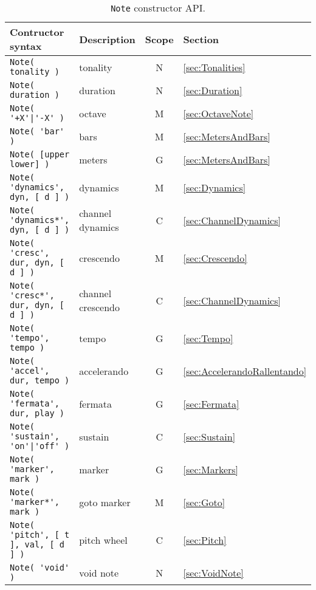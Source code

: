 \documentclass{article}
\newcommand{\note}{\lstinline!Note!\xspace}
\begin{document}
\begin{table}
  \centering
  \begin{tabular}{llcl}
    Contructor syntax & Description & Scope & Section \\
    \hline
    \lstinline!Note( tonality )! & tonality & N & \ref{sec:Tonalities} \\
    \lstinline!Note( duration )! & duration & N & \ref{sec:Duration} \\
    \lstinline!Note( '+X'|'-X' )! & octave & M & \ref{sec:OctaveNote} \\
    \lstinline!Note( 'bar' )! & bars & M & \ref{sec:MetersAndBars} \\
    \lstinline!Note( [upper lower] )! & meters & G & \ref{sec:MetersAndBars} \\
    \lstinline!Note( 'dynamics', dyn, [ d ] )! & dynamics & M & \ref{sec:Dynamics} \\
    \lstinline!Note( 'dynamics*', dyn, [ d ] )! & channel dynamics & C & \ref{sec:ChannelDynamics} \\
    \lstinline!Note( 'cresc', dur, dyn, [ d ] )! & crescendo & M & \ref{sec:Crescendo} \\
    \lstinline!Note( 'cresc*', dur, dyn, [ d ] )! & channel crescendo & C & \ref{sec:ChannelDynamics} \\
    \lstinline!Note( 'tempo', tempo )! & tempo & G & \ref{sec:Tempo} \\
    \lstinline!Note( 'accel', dur, tempo )! & accelerando & G & \ref{sec:AccelerandoRallentando} \\
    \lstinline!Note( 'fermata', dur, play )! & fermata & G & \ref{sec:Fermata} \\
    \lstinline!Note( 'sustain', 'on'|'off' )! & sustain & C & \ref{sec:Sustain} \\
    \lstinline!Note( 'marker', mark )! & marker & G & \ref{sec:Markers} \\
    \lstinline!Note( 'marker*', mark )! & goto marker & M & \ref{sec:Goto} \\
    \lstinline!Note( 'pitch', [ t ], val, [ d ] )! & pitch wheel & C & \ref{sec:Pitch} \\
    \lstinline!Note( 'void' )! & void note & N & \ref{sec:VoidNote} \\
  \end{tabular}
  \caption[\note constructor API]{\note constructor API.}
  \label{tab:NoteAPI}
\end{table}
\end{document}
